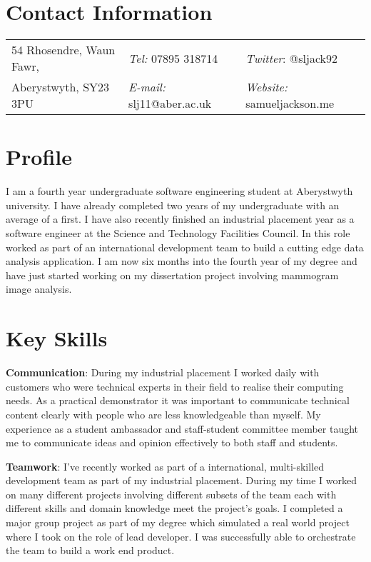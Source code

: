 \documentclass[margin,line]{res}
\begin{document}

\begin{resume}
\section{\sc Contact Information}
\vspace{.05in}
\begin{tabular}{@{}p{2in}p{2in}p{2in}}
54 Rhosendre, Waun Fawr,             & {\it Tel:}  07895 318714 & {\it Twitter}: @sljack92 \\
Aberystwyth, SY23 3PU & {\it E-mail:}  slj11@aber.ac.uk & {\it Website:} samueljackson.me \\
\end{tabular}

\section{\sc Profile}
I am a fourth year undergraduate software engineering student at Aberystwyth university. I have already completed two years of my undergraduate with an average of a first. I have also recently finished an industrial placement year as a software engineer at the Science and Technology Facilities Council. In this role worked as part of an international development team to build a cutting edge data analysis application. I am now six months into the fourth year of my degree and have just started working on my dissertation project involving mammogram image analysis.

\section{\sc Key Skills}

{\bf Communication}: During my industrial placement I worked daily with customers who were technical experts in their field to realise their computing needs. As a practical demonstrator it was important to communicate technical content clearly with people who are less knowledgeable than myself. My experience as a student ambassador and staff-student committee member taught me to communicate ideas and opinion effectively to both staff and students.

{\bf Teamwork}: I've recently worked as part of a international, multi-skilled development team as part of my industrial placement. During my time I worked on many different projects involving different subsets of the team each with different skills and domain knowledge meet the project's goals. I completed a major group project as part of my degree which simulated a real world project where I took on the role of lead developer. I was successfully able to orchestrate the team to build a work end product.


\end{resume}
\end{document}
